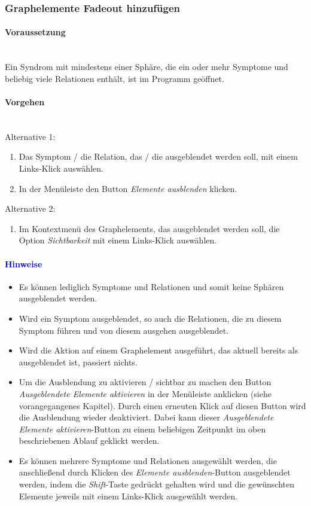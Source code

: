 \documentclass[enabledeprecatedfontcommands,fontsize=11pt,paper=a4,twoside]{scrartcl}
\newcounter{one}
\newcommand*{\hint}{\paragraph{\textcolor{blue}{Hinweise}}}
\newcommand*{\condition}{\paragraph{Voraussetzung}$\;$ \vspace{0.2cm}\\}
\newcommand*{\actions}{\paragraph{Vorgehen} $\;$\vspace{0.2cm}\\}
\begin{document}
		\subsubsection{Graphelemente Fadeout hinzufügen}
	\condition 	
		Ein Syndrom mit mindestens einer Sphäre, die ein oder mehr Symptome und beliebig viele Relationen enthält, ist im Programm geöffnet. 
		\actions
		Alternative 1:
		\begin{enumerate}
			\item Das Symptom / die Relation, das / die ausgeblendet werden soll, mit einem Links-Klick auswählen. 
			\item In der Menüleiste den Button \textit{Elemente ausblenden} klicken.
		\end{enumerate}
				Alternative 2:
		\begin{enumerate}
			\item Im Kontextmenü des Graphelements, das ausgeblendet werden soll, die Option \textit{Sichtbarkeit} mit einem Links-Klick auswählen.
		\end{enumerate}
		\hint
		\begin{itemize}
					\item Es können lediglich Symptome und Relationen und somit keine Sphären ausgeblendet werden. 
					\item Wird ein Symptom ausgeblendet, so auch die Relationen, die zu diesem Symptom führen und von diesem ausgehen ausgeblendet.
					\item Wird die Aktion auf einem Graphelement ausgeführt, das aktuell bereits als ausgeblendet ist, passiert nichts.
					\item Um die Ausblendung zu aktivieren / sichtbar zu machen den Button \textit{Ausgeblendete Elemente aktivieren} in der Menüleiste anklicken (siehe vorangegangenes Kapitel). Durch einen erneuten Klick auf diesen Button wird die Ausblendung wieder deaktiviert. Dabei kann dieser \textit{Ausgeblendete Elemente aktivieren}-Button zu einem beliebigen Zeitpunkt im oben beschriebenen Ablauf geklickt werden.
					\item Es können mehrere Symptome und Relationen ausgewählt werden, die anschließend durch Klicken des \textit{Elemente ausblenden}-Button ausgeblendet werden, indem die \textit{Shift}-Taste gedrückt gehalten wird und die gewünschten Elemente jeweils mit einem Links-Klick ausgewählt werden.
		\end{itemize}
		
			\newpage
\end{document}
